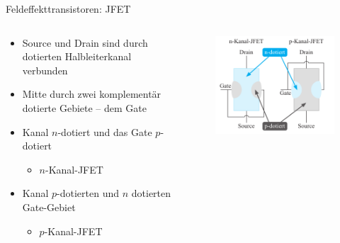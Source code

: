 \documentclass[12pt%
,aspectratio=169%
]{beamer}
\begin{document}
\begin{frame}{Feldeffekttransistoren: JFET}
\begin{columns}[T] %
\begin{column}{.58\textwidth}
	\begin{itemize}
		\item Source und Drain sind durch dotierten Halbleiterkanal verbunden
		\item Mitte durch zwei komplementär dotierte Gebiete -- dem Gate
		\item Kanal $n$-dotiert und das Gate $p$-dotiert
		\begin{itemize}
			\item $n$-Kanal-JFET
		\end{itemize}
		\item Kanal $p$-dotierten und $n$ dotierten Gate-Gebiet
		\begin{itemize}
			\item $p$-Kanal-JFET
		\end{itemize}
	\end{itemize}
\end{column}%
\hfill%
\begin{column}{.38\textwidth}
\begin{figure}
\center
\includegraphics[scale=0.4]{pictures/jfet_aufbau}\\
\end{figure}
\end{column}%
\end{columns}
\end{frame}
\end{document}
